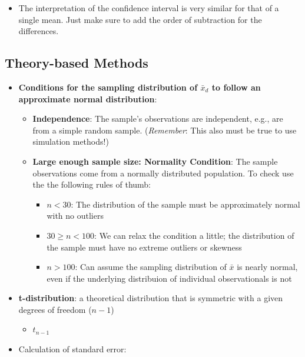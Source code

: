 \documentclass[
]{report}
\providecommand{\tightlist}{%
  \setlength{\itemsep}{0pt}\setlength{\parskip}{0pt}}
\begin{document}
\begin{itemize}
\tightlist
\item
  The interpretation of the confidence interval is very similar for that of a single mean. Just make sure to add the order of subtraction for the differences.
\end{itemize}

\subsection*{Theory-based Methods}\label{theory-based-methods}

\begin{itemize}
\item
  \textbf{Conditions for the sampling distribution of \(\bar{x}_d\) to follow an approximate normal distribution}:

  \begin{itemize}
  \item
    \textbf{Independence}: The sample's observations are independent, e.g., are from a simple random sample. (\emph{Remember}: This also must be true to use simulation methods!)
  \item
    \textbf{Large enough sample size: Normality Condition}: The sample observations come from a normally distributed population. To check use the the following rules of thumb:

    \begin{itemize}
    \item
      \(n < 30\): The distribution of the sample must be approximately normal with no outliers
    \item
      \(30 \ge n < 100\): We can relax the condition a little; the distribution of the sample must have no extreme outliers or skewness
    \item
      \(n > 100\): Can assume the sampling distribution of \(\bar{x}\) is nearly normal, even if the underlying distribuion of individual observationals is not
    \end{itemize}
  \end{itemize}
\item
  \textbf{t-distribution}: a theoretical distribution that is symmetric with a given degrees of freedom (\(n-1\))

  \begin{itemize}
  \tightlist
  \item
    \(t_{n-1}\)
  \end{itemize}
\item
  Calculation of standard error:
\end{itemize}
\end{document}
